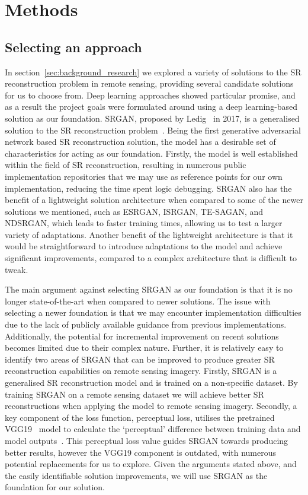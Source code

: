 \chapter{Methods}\label{chapter2}
\section{Selecting an approach}\label{sec:selecting_an_approach}
In section~\ref{sec:background_research} we explored a variety of solutions to the SR reconstruction problem in remote sensing, providing several candidate solutions for us to choose from. Deep learning approaches showed particular promise, and as a result the project goals were formulated around using a deep learning-based solution as our foundation. SRGAN, proposed by Ledig \etal\ in 2017, is a generalised solution to the SR reconstruction problem~\cite{srgan}. Being the first generative adversarial network based SR reconstruction solution, the model has a desirable set of characteristics for acting as our foundation. Firstly, the model is well established within the field of SR reconstruction, resulting in numerous public implementation repositories that we may use as reference points for our own implementation, reducing the time spent logic debugging. SRGAN also has the benefit of a lightweight solution architecture when compared to some of the newer solutions we mentioned, such as ESRGAN, ISRGAN, TE-SAGAN, and NDSRGAN, which leads to faster training times, allowing us to test a larger variety of adaptations. Another benefit of the lightweight architecture is that it would be straightforward to introduce adaptations to the model and achieve significant improvements, compared to a complex architecture that is difficult to tweak.

The main argument against selecting SRGAN as our foundation is that it is no longer state-of-the-art when compared to newer solutions. The issue with selecting a newer foundation is that we may encounter implementation difficulties due to the lack of publicly available guidance from previous implementations. Additionally, the potential for incremental improvement on recent solutions becomes limited due to their complex nature. Further, it is relatively easy to identify two areas of SRGAN that can be improved to produce greater SR reconstruction capabilities on remote sensing imagery. Firstly, SRGAN is a generalised SR reconstruction model and is trained on a non-specific dataset. By training SRGAN on a remote sensing dataset we will achieve better SR reconstructions when applying the model to remote sensing imagery. Secondly, a key component of the loss function, perceptual loss, utilises the pretrained VGG19~\cite{vgg19} model to calculate the `perceptual' difference between training data and model outputs~\cite{srgan}. This perceptual loss value guides SRGAN towards producing better results, however the VGG19 component is outdated, with numerous potential replacements for us to explore. Given the arguments stated above, and the easily identifiable solution improvements, we will use SRGAN as the foundation for our solution.


